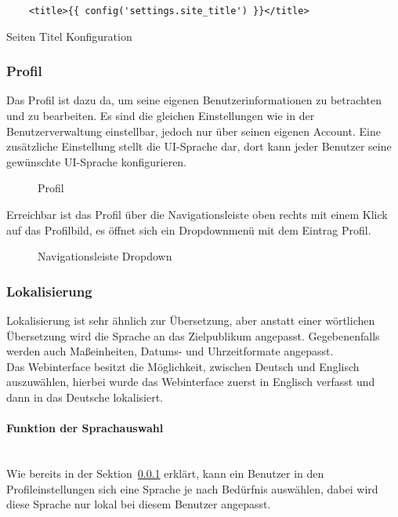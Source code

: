 \begin{listing}[H]
  \begin{verbatim}
    <title>{{ config('settings.site_title') }}</title>
  \end{verbatim}
  \caption{Seiten Titel Konfiguration}
\end{listing}

\subsubsection{Profil}\label{sec:profile}
Das Profil ist dazu da, um seine eigenen Benutzerinformationen zu betrachten und
zu bearbeiten. Es sind die gleichen Einstellungen wie in der Benutzerverwaltung
einstellbar, jedoch nur über seinen eigenen Account. Eine zusätzliche
Einstellung stellt die UI-Sprache dar, dort kann jeder Benutzer seine gewünschte
UI-Sprache konfigurieren.\\

\begin{figure}[H]
  \centering
  \caption{Profil}
\end{figure}

Erreichbar ist das Profil über die Navigationsleiste oben rechts mit einem Klick
auf das Profilbild, es öffnet sich ein Dropdownmenü mit dem Eintrag Profil. 

\begin{figure}[H]
  \centering
  \caption{Navigationsleiste Dropdown}
\end{figure}

\subsubsection{Lokalisierung}
Lokalisierung ist sehr ähnlich zur Übersetzung, aber anstatt einer wörtlichen
Übersetzung wird die Sprache an das Zielpublikum angepasst. Gegebenenfalls
werden auch Maßeinheiten, Datums- und Uhrzeitformate angepasst.\\

Das Webinterface besitzt die Möglichkeit, zwischen Deutsch und Englisch
auszuwählen, hierbei wurde das Webinterface zuerst in Englisch verfasst und dann
in das Deutsche lokalisiert.

\paragraph{Funktion der Sprachauswahl}\mbox{}\\
Wie bereits in der Sektion~\ref{sec:profile} erklärt, kann ein Benutzer in den
Profileinstellungen sich eine Sprache je nach Bedürfnis auswählen, dabei wird
diese Sprache nur lokal bei diesem Benutzer angepasst.\\

